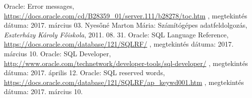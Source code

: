 

\begin{thebibliography}{}

Oracle: Error messages, \url{https://docs.oracle.com/cd/B28359_01/server.111/b28278/toc.htm}
, megtekintés dátuma: 2017. március 03.
Nyesőné Marton Mária: Számítógépes adatfeldolgozás, \textit{Eszterházy Károly Főiskola}, 2011. 08. 31.
Oracle: SQL Language Reference, \url{https://docs.oracle.com/database/121/SQLRF/}
, megtekintés dátuma: 2017. március 10.
Oracle: SQL Developer, \url{http://www.oracle.com/technetwork/developer-tools/sql-developer/}
, megtekintés dátuma: 2017. április 12.
Oracle: SQL reserved words, \url{https://docs.oracle.com/database/121/SQLRF/ap_keywd001.htm}
, megtekintés dátuma: 2017. március 10.

\end{thebibliography}